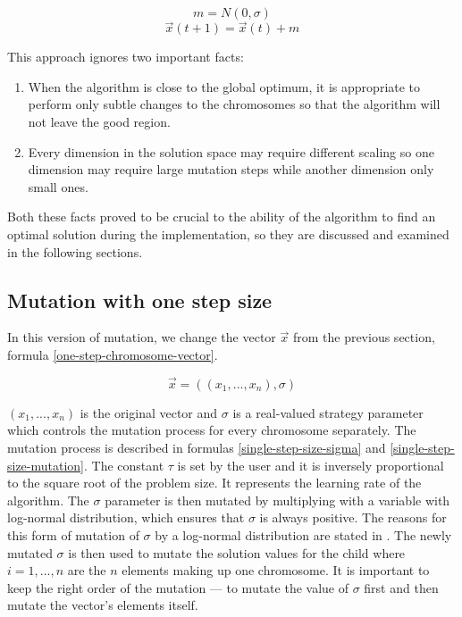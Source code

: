 \begin{equation}
\label{normal-distribution}
    m = N(0, \sigma)
\end{equation}
\begin{equation} \label{simple-mutation}
    \vec{x}(t+1) = \vec{x}(t) + m
\end{equation}

This approach ignores two important facts:
\begin{enumerate}
    \item When the algorithm is close to the global optimum, it is appropriate to perform only subtle changes to the chromosomes so that the algorithm will not leave the good region.
    \item Every dimension in the solution space may require different scaling so one dimension may require large mutation steps while another dimension only small ones.
\end{enumerate}

Both these facts proved to be crucial to the ability of the algorithm to find an optimal solution during the implementation, so they are discussed and examined in the following sections.

\subsection{Mutation with one step size}
In this version of mutation, we change the vector $\vec{x}$ from the previous section, formula \ref{one-step-chromosome-vector}.

\begin{equation} \label{one-step-chromosome-vector}
\vec{x} = ((x_1,...,x_n),\sigma)
\end{equation}

$(x_1,...,x_n)$ is the original vector and $\sigma$ is a real-valued strategy parameter which controls the mutation process for every chromosome separately. The mutation process is described in formulas \ref{single-step-size-sigma} and \ref{single-step-size-mutation}. The constant $\tau$ is set by the user and it is inversely proportional to the square root of the problem size. It represents the learning rate of the algorithm. The $\sigma$ parameter is then mutated by multiplying with a variable with log-normal distribution, which ensures that $\sigma$ is always positive. The reasons for this form of mutation of $\sigma$ by a log-normal distribution are stated in \cite{introduction-to-evolutionary-computing}. The newly mutated $\sigma$ is then used to mutate the solution values for the child where $i = 1,...,n$ are the $n$ elements making up one chromosome. It is important to keep the right order of the mutation --- to mutate the value of $\sigma$ first and then mutate the vector's elements itself.

